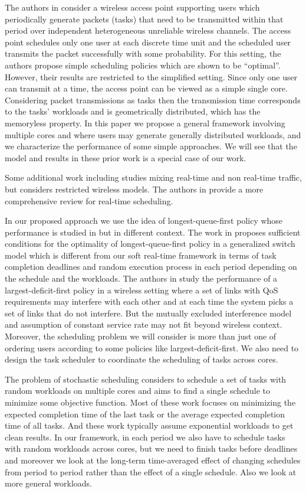 \documentclass[prodmode,acmtompecs]{acmsmall}
\newcommand{\myComments}[1]{}
\newcommand{\commentEnd}{\myComments{End}}
\begin{document}
The authors in \cite{HoK13bA} \cite{HoK12A} consider a wireless access point supporting users which periodically generate packets (tasks) that need to be transmitted within that period over independent heterogeneous unreliable wireless channels. 
The access point schedules only one user at each discrete time unit and the scheduled user transmits the packet successfully with some probability. 
For this setting, the authors propose simple scheduling policies which are shown to be ``optimal''. However, their results are restricted to the simplified setting. 
Since only one user can transmit at a time, the access point can be viewed as a simple single core. Considering packet transmissions as tasks then the transmission time corresponds to the tasks' workloads and is geometrically distributed, which has the memoryless property. In this paper we propose a general framework involving multiple cores and where users may generate generally distributed workloads, and we characterize the performance of some simple approaches. We will see that the model and results in these prior work is a special case of our work. 

Some additional work including \cite{ShS01A} \cite{JaS11A} studies mixing real-time and non real-time traffic, but considers restricted wireless models. The authors in \cite{DaB11A} \cite{SAA04} provide a more comprehensive review for real-time scheduling. 

In our proposed approach we use the idea of longest-queue-first policy whose performance is studied in \cite{DiW06} \cite{KWJ13A} but in different context. The work in \cite{DiW06} proposes sufficient conditions for the optimality of longest-queue-first policy in a generalized switch model which is different from our soft real-time framework in terms of task completion deadlines and random execution process in each period depending on the schedule and the workloads. 
The authors in \cite{KWJ13A} study the performance of a largest-deficit-first policy in a wireless setting where a set of links with QoS requirements may interfere with each other and at each time the system picks a set of links that do not interfere. But the mutually excluded interference model and assumption of constant service rate may not fit beyond wireless context. Moreover, the scheduling problem we will consider is more than just one of ordering users according to some policies like largest-deficit-first. We also need to design the task scheduler to coordinate the scheduling of tasks across cores. 

The problem of stochastic scheduling \cite{Pin12b} considers to schedule a set of tasks with random workloads on multiple cores and aims to find a single schedule to minimize some objective function. Most of these work focuses on minimizing the expected completion time of the last task or the average expected completion time of all tasks. And these work typically assume exponential workloads to get clean results. In our framework, in each period we also have to schedule tasks with random workloads across cores, but we need to finish tasks before deadlines and moreover we look at the long-term time-averaged effect of changing schedules from period to period rather than the effect of a single schedule. Also we look at more general workloads. 
\commentEnd
\fi
\end{document}
